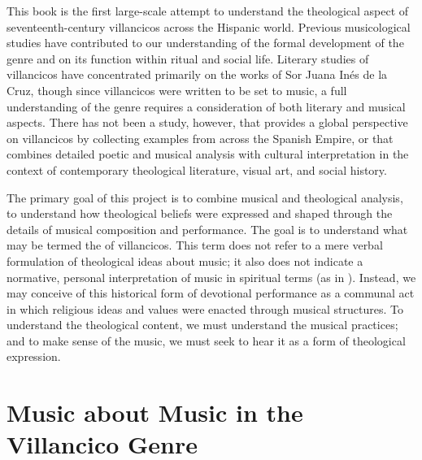 This book is the first large-scale attempt to understand the theological aspect 
of seventeenth-century villancicos across the Hispanic world.
Previous musicological studies have contributed to our understanding of the 
formal development of the genre and on its function within ritual and social 
life. %
Literary studies of villancicos have concentrated primarily on the works of Sor 
Juana Inés de la Cruz, though since villancicos were written to be set to 
music, a full understanding of the genre requires a consideration of both 
literary and musical aspects. %
There has not been a study, however, that provides a global perspective on 
villancicos by collecting examples from across the Spanish Empire, or that 
combines detailed poetic and musical analysis with cultural interpretation in 
the context of contemporary theological literature, visual art, and social 
history.

The primary goal of this project is to combine musical and theological 
analysis, to understand how theological beliefs were expressed and shaped 
through the details of musical composition and performance.
The goal is to understand what may be termed the  of 
villancicos.
This term does not refer to a mere verbal formulation of theological ideas 
about music; it also does not indicate a normative, personal interpretation of 
music in spiritual terms (as in ). %
Instead, we may conceive of this historical form of devotional performance as a 
communal act in which religious ideas and values were enacted through musical 
structures.
To understand the theological content, we must understand the musical 
practices; and to make sense of the music, we must seek to hear it as a form of 
theological expression.


\section{Music about Music in the Villancico Genre}

